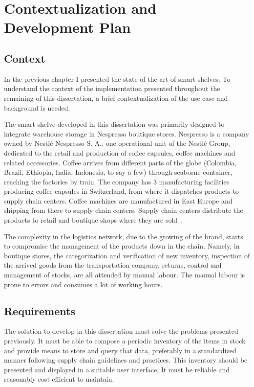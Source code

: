 \chapter{Contextualization and Development Plan}

\section{Context}

In the previous chapter I presented the state of the art of smart shelves. 
To understand the context of the implementation presented throughout the remaining of this dissertation, a brief contextualization of the use case and background is needed.

The smart shelve developed in this dissertation was primarily designed to integrate warehouse storage in Nespresso boutique stores.
Nespresso is a company owned by Nestlé Nespresso S. A., one operational unit of the Nestlé Group, dedicated to the retail and production of coffee capsules, coffee machines and related accessories.
Coffee arrives from different parts of the globe (Colombia, Brazil, Ethiopia, India, Indonesia, to say a few) through seaborne container, reaching the factories by train.
The company has 3 manufacturing facilities producing coffee capsules in Switzerland, from where it dispatches products to supply chain centers.
Coffee machines are manufactured in East Europe and shipping from there to supply chain centers.
Supply chain centers distribute the products to retail and boutique shops where they are sold~\cite{PortugalRecebeCentro}.

The  complexity  in  the logistics network, due to the growing of the brand, starts to compromise the management of the products down in the chain.
Namely, in boutique stores, the categorization and verification of new inventory, inspection of the arrived goods from the transportation company, returns, control and management of stocks, are all attended by manual labour. The manual labour is prone to errors and consumes a lot of working hours.

\section{Requirements}

The solution to develop in this dissertation must solve the problems presented previously.
It must be able to compose a periodic inventory of the items in stock and provide means to store and query that data, preferably in a standardized manner following supply chain guidelines and practices.
This inventory should be presented and displayed in a suitable user interface.
It must be reliable and reasonably cost efficient to maintain.

